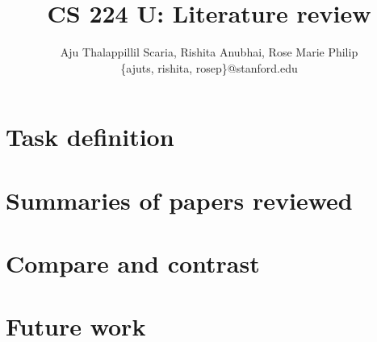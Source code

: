 \documentclass[letterpaper]{article}
\begin{document}
\title{
CS 224 U: Literature review
}

\author{
Aju Thalappillil Scaria, Rishita Anubhai, Rose Marie Philip \\
\{ajuts, rishita, rosep\}@stanford.edu\\
}

\maketitle


%

\section{Task definition}
\label{sec:intro}


\section{Summaries of papers reviewed}
\label{sec:summary}




\section{Compare and contrast}
\label{sec:compare}




\section{Future work}
\label{sec:future}





%
\end{document}
